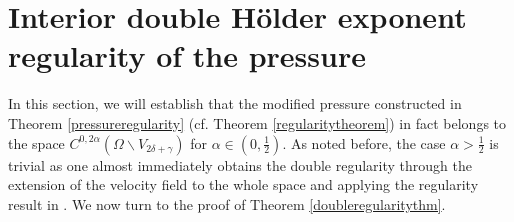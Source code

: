 \documentclass[12pt,a4paper]{article}
\theoremstyle{definition}
\theoremstyle{remark}
\numberwithin{equation}{section}
\begin{document}
\section{Interior double Hölder exponent regularity of the pressure} \label{doubleregularitysection}
In this section, we will establish that the modified pressure constructed in Theorem \ref{pressureregularity} (cf. Theorem \ref{regularitytheorem}) in fact belongs to the space $C^{0,2\alpha} (\Omega \backslash V_{2 \delta + \gamma} )$ for $\alpha \in \left(0, \frac{1}{2} \right)$. As noted before, the case $\alpha > \frac{1}{2}$ is trivial as one almost immediately obtains the double regularity through the extension of the velocity field to the whole space and applying the regularity result in \cite{silvestre}. We now turn to the proof of Theorem \ref{doubleregularitythm}.
\end{document}
